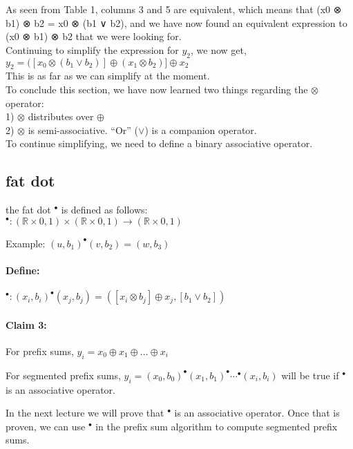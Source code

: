 \documentclass[11pt]{article}
\begin{document}
As seen from Table 1, columns 3 and 5 are equivalent, which means that (x0 ⊗ b1) ⊗ b2 = x0 ⊗ (b1 ∨ b2), and we have now found an equivalent expression to (x0 ⊗ b1) ⊗ b2 that we were looking for.\\

Continuing to simplify the expression for $y_2$, we now get,\\
$y_2 = ([x_0 \otimes (b_1 \vee b_2)] \oplus (x_1 \otimes b_2)] \oplus x_2$ \\
This is as far as we can simplify at the moment.\\

To conclude this section, we have now learned two things regarding the $\otimes$ operator:\\
1) $\otimes$ distributes over $\oplus$\\
2) $\otimes$ is semi-associative. “Or” ($\vee$) is a companion operator.\\

To continue simplifying, we need to define a binary associative operator.

\subsection{fat dot}

the fat dot $^{\bullet}$ is defined as follows:\\

$^{\bullet}: (\mathbb{R} \times {0,1}) \times (\mathbb{R} \times {0,1}) \longrightarrow (\mathbb{R} \times {0,1})$

Example: $(u, b_1) ^{\bullet} (v, b_2) = (w, b_3)$\\

\paragraph{Define:} $^{\bullet} : (x_i, b_i) ^{\bullet} (x_j, b_j) = ([x_i \otimes b_j] \oplus x_j , [b_1 \vee b_2])$

\paragraph{Claim 3:} For prefix sums, $y_i = x_0 \oplus x_1 \oplus \dots \oplus x_i$

For segmented prefix sums, $y_i = (x_0 , b_0) ^{\bullet} (x_1 , b_1) ^{\bullet} \cdots ^{\bullet} (x_i , b_i)$ will be true if $^{\bullet}$ is an associative operator.

In the next lecture we will prove that $^{\bullet}$ is an associative operator. Once that is proven, we can use $^{\bullet}$ in the prefix sum algorithm to compute segmented prefix sums.            

%

\end{document}
